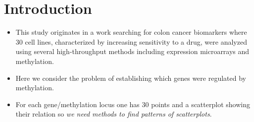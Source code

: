 
\section{Introduction}

\begin{itemize}
  \item This study originates in a work searching for colon cancer biomarkers \cite{bazzocco} where  30 cell lines, characterized by increasing sensitivity to a drug, were analyzed using several high-throughput methods including expression microarrays and methylation.
\item Here we consider the problem of establishing which genes were regulated by methylation.
\item For each gene/methylation locus one has 30 points and a scatterplot showing their relation so \textit{we need methods to find patterns of scatterplots}.
  \end{itemize}

